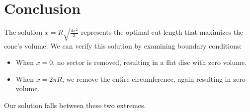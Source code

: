 \documentclass{article}
\begin{document}
\section{Conclusion}
The solution \( x = R\sqrt{\frac{4\pi^2}{3}} \) represents the optimal cut length that maximizes the cone's volume. We can verify this solution by examining boundary conditions: 
\begin{itemize}
    \item When \( x = 0 \), no sector is removed, resulting in a flat disc with zero volume. 
    \item When \( x = 2\pi R \), we remove the entire circumference, again resulting in zero volume. 
\end{itemize}
Our solution falls between these two extremes.
\end{document}
